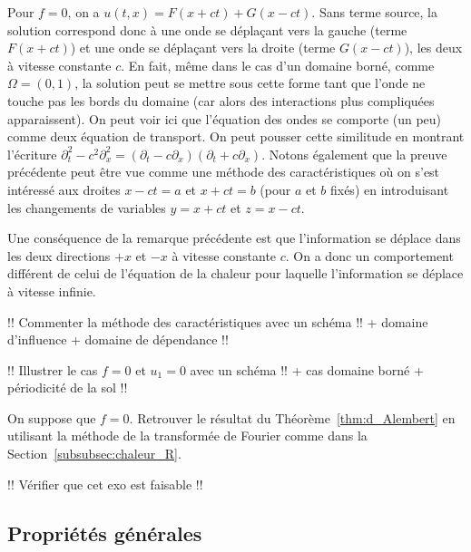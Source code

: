 \documentclass[12pt,a4paper,twoside]{article}
\begin{document}
\begin{remark}
  Pour $f=0$, on a $u(t,x) = F(x+ct) + G(x-ct)$.
  Sans terme source, la solution correspond donc \`a une onde se d\'epla\c{c}ant vers la gauche
  (terme $F(x+ct)$) et une onde se d\'epla\c{c}ant vers la droite (terme $G(x-ct)$), les deux
  \`a vitesse constante $c$.
  En fait, m\^eme dans le cas d'un domaine born\'e, comme $\Omega = (0,1)$,
  la solution peut se mettre sous cette forme tant que l'onde ne touche pas les bords du domaine
  (car alors des interactions plus compliqu\'ees apparaissent).
  On peut voir ici que l'\'equation des ondes se comporte (un peu)
  comme deux \'equation de transport.
  On peut pousser cette similitude en montrant l'\'ecriture
  $\partial_t^2 - c^2 \partial_x^2 = (\partial_t - c \partial_x)(\partial_t + c \partial_x)$.
  Notons \'egalement que la preuve pr\'ec\'edente peut \^etre vue
  comme une m\'ethode des caract\'eristiques o\`u on s'est int\'eress\'e aux droites
  $x-ct = a$ et $x+ct = b$ (pour $a$ et $b$ fix\'es) en introduisant les changements de variables
  $y = x+ct$ et $z = x-ct$.
\end{remark}

\begin{remark}
  Une cons\'equence de la remarque pr\'ec\'edente est que l'information se d\'eplace dans les
  deux directions $+x$ et $-x$ \`a vitesse constante $c$.
  On a donc un comportement diff\'erent de celui de l'\'equation de la chaleur pour laquelle
  l'information se d\'eplace \`a vitesse infinie.
\end{remark}

!! Commenter la m\'ethode des caract\'eristiques avec un sch\'ema !! + domaine d'influence
+ domaine de d\'ependance !!

!! Illustrer le cas $f= 0$ et $u_1 = 0$ avec un sch\'ema !! + cas domaine born\'e
+ p\'eriodicit\'e de la sol !!

\begin{exercise}
  On suppose que $f = 0$.
  Retrouver le r\'esultat du Th\'eor\`eme~\ref{thm:d_Alembert}
  en utilisant la m\'ethode de la transform\'ee de Fourier comme dans
  la Section~\ref{subsubsec:chaleur_R}.
\end{exercise}

!! V\'erifier que cet exo est faisable !!

\subsection{Propri\'et\'es g\'en\'erales}
\end{document}
